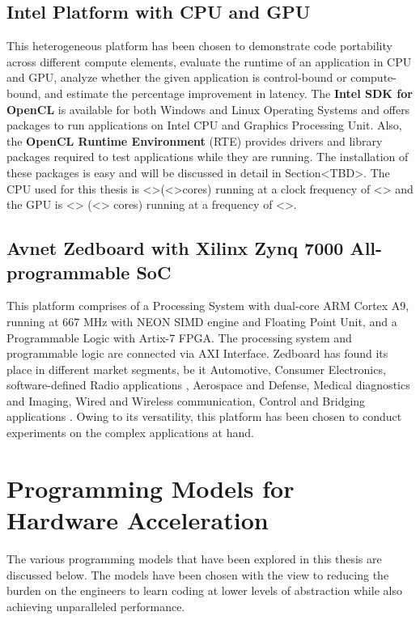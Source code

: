\subsection{Intel Platform with CPU and GPU}
This heterogeneous platform has been chosen to demonstrate code portability across different compute elements, evaluate the runtime of an application in CPU and GPU, analyze whether the given application is control-bound or compute-bound, and estimate the percentage improvement in latency. The \textbf{Intel SDK for OpenCL}\cite{intel_openclSDK} is available for both Windows and Linux Operating Systems and offers packages to run applications on Intel CPU and Graphics Processing Unit. Also, the \textbf{OpenCL Runtime Environment} (RTE) \cite{intel_runtime} provides drivers and library packages required to test applications while they are running. The installation of these packages is easy and will be discussed in detail in Section<TBD>. The CPU used for this thesis is <>(<>cores) running at a clock frequency of <> and the GPU is <> (<> cores) running at a frequency of <>.  
\subsection{Avnet Zedboard with Xilinx Zynq 7000 All-programmable SoC}
This platform comprises of a Processing System with dual-core ARM Cortex A9, running at 667 MHz with NEON SIMD engine and Floating Point Unit, and a Programmable Logic with Artix-7 FPGA. The processing system and programmable logic are connected via AXI Interface. Zedboard has found its place in different market segments, be it Automotive, Consumer Electronics, software-defined Radio applications \cite{dobson2014architecture}, Aerospace and Defense, Medical diagnostics and Imaging, Wired and Wireless communication, Control and Bridging applications \cite{xil_zynqbrief}. Owing to its versatility, this platform has been chosen to conduct experiments on the complex applications at hand.
\section{Programming Models for Hardware Acceleration}
\label{2_3}
The various programming models that have been explored in this thesis are discussed below. The models have been chosen with the view to reducing the burden on the engineers to learn coding at lower levels of abstraction while also achieving unparalleled performance.
